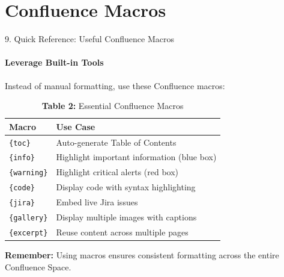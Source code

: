 \documentclass[10pt, aspectratio=169]{beamer}
\begin{document}
	\section{Confluence Macros}
	\begin{frame}{9. Quick Reference: Useful Confluence Macros}
		\framesubtitle{Leverage Built-in Tools}
		Instead of manual formatting, use these Confluence macros:
		
		\pause
		\begin{table}[]
			\centering
			\caption{\textbf{Table 2:} Essential Confluence Macros}
			\begin{tabular}{|p{3cm}|p{8cm}|}
				\hline
				\textbf{Macro} & \textbf{Use Case} \\
				\hline
				\texttt{\{toc\}} & Auto-generate Table of Contents \\
				\hline
				\texttt{\{info\}} & Highlight important information (blue box) \\
				\hline
				\texttt{\{warning\}} & Highlight critical alerts (red box) \\
				\hline
				\texttt{\{code\}} & Display code with syntax highlighting \\
				\hline
				\texttt{\{jira\}} & Embed live Jira issues \\
				\hline
				\texttt{\{gallery\}} & Display multiple images with captions \\
				\hline
				\texttt{\{excerpt\}} & Reuse content across multiple pages \\
				\hline
			\end{tabular}
		\end{table}
		
		\vfill
		\pause
		\textbf{Remember:} Using macros ensures consistent formatting across the entire Confluence Space.
	\end{frame}
	
\end{document}
